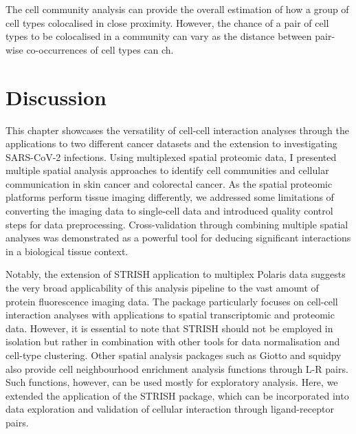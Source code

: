 The cell community analysis can provide the overall estimation of how a group of cell types colocalised in close proximity. However, the chance of a pair of cell types to be colocalised in a community can vary as the distance between  pair-wise co-occurrences of cell types can ch.  

\section{Discussion}
This chapter showcases the versatility of cell-cell interaction analyses through the applications to two different cancer datasets and the extension to investigating SARS-CoV-2 infections. Using multiplexed spatial proteomic data, I presented multiple spatial analysis approaches to identify cell communities and cellular communication in skin cancer and colorectal cancer. As the spatial proteomic platforms perform tissue imaging differently, we addressed some limitations of converting the imaging data to single-cell data and introduced quality control steps for data preprocessing. Cross-validation through combining multiple spatial analyses was demonstrated as a powerful tool for deducing significant interactions in a biological tissue context.   

Notably, the extension of STRISH application to multiplex Polaris data suggests the very broad applicability of this analysis pipeline to the vast amount of protein fluorescence imaging data. The package particularly focuses on cell-cell interaction analyses with applications to spatial transcriptomic and proteomic data. However, it is essential to note that STRISH should not be employed in isolation but rather in combination with other tools for data normalisation and cell-type clustering. Other spatial analysis packages such as Giotto \cite{dries2021giotto} and squidpy \cite{palla2022squidpy} also provide cell neighbourhood enrichment analysis functions through L-R pairs. Such functions, however, can be used mostly for exploratory analysis. Here, we extended the application of the STRISH package, which can be incorporated into data exploration and validation of cellular interaction through ligand-receptor pairs. 

